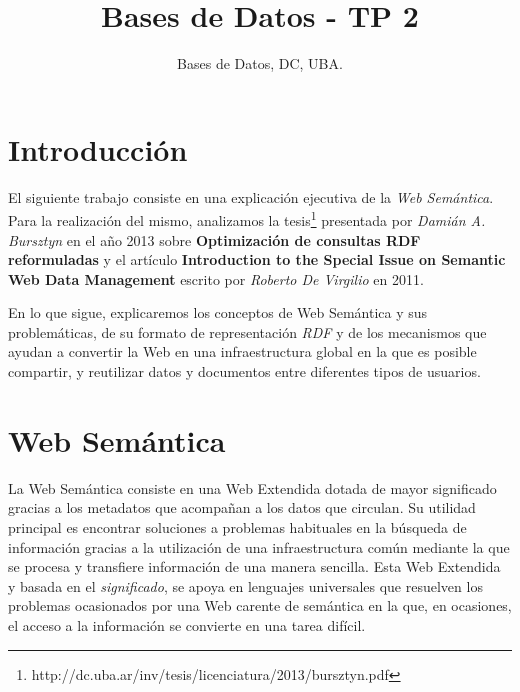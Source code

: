 \documentclass[10pt,a4paper]{article}
\title{Bases de Datos - TP 2}
\author{Bases de Datos, DC, UBA.}
\begin{document}



\maketitle

\tableofcontents

\newpage

\section{Introducción}

El siguiente trabajo consiste en una explicación ejecutiva de la \textit{Web Semántica}. Para la realización del mismo, analizamos la tesis\footnote{http://dc.uba.ar/inv/tesis/licenciatura/2013/bursztyn.pdf} presentada por \textit{Damián A. Bursztyn} en el año 2013 sobre \textbf{Optimización de consultas RDF reformuladas} y el artículo \textbf{Introduction to the Special Issue on Semantic Web Data Management} escrito por \textit{Roberto De Virgilio} en 2011.

En lo que sigue, explicaremos los conceptos de Web Semántica y sus problemáticas, de su formato de representación \textit{RDF} y de los mecanismos que ayudan a convertir la Web en una infraestructura global en la que es posible compartir, y reutilizar datos y documentos entre diferentes tipos de usuarios.

\section{Web Semántica}
La Web Semántica consiste en una Web Extendida dotada de mayor significado gracias a los metadatos que acompañan a los datos que circulan. Su utilidad principal es encontrar soluciones a problemas habituales en la búsqueda de información gracias a la utilización de una infraestructura común mediante la que se procesa y transfiere información de una manera sencilla. Esta Web Extendida y basada en el \textit{significado}, se apoya en lenguajes universales que resuelven los problemas ocasionados por una Web carente de semántica en la que, en ocasiones, el acceso a la información se convierte en una tarea difícil.
\end{document}
